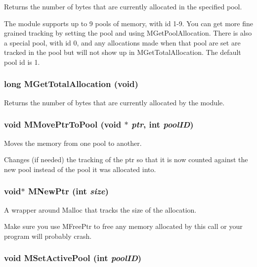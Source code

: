 Returns the number of bytes that are currently allocated in the specified pool. 

The module supports up to 9 pools of memory, with id 1-9. You can get more fine grained tracking by setting the pool and using MGet\-Pool\-Allocation. There is also a special pool, with id 0, and any allocations made when that pool are set are tracked in the pool but will not show up in MGet\-Total\-Allocation. The default pool id is 1. 
\subsubsection{\setlength{\rightskip}{0pt plus 5cm}long MGet\-Total\-Allocation (void)}\label{memory_8h_a19}


Returns the number of bytes that are currently allocated by the module. 

\subsubsection{\setlength{\rightskip}{0pt plus 5cm}void MMove\-Ptr\-To\-Pool (void $\ast$ {\em ptr}, int {\em pool\-ID})}\label{memory_8h_a23}


Moves the memory from one pool to another. 

Changes (if needed) the tracking of the ptr so that it is now counted against the new pool instead of the pool it was allocated into. 
\subsubsection{\setlength{\rightskip}{0pt plus 5cm}void$\ast$ MNew\-Ptr (int {\em size})}\label{memory_8h_a8}


A wrapper around Malloc that tracks the size of the allocation. 

Make sure you use MFree\-Ptr to free any memory allocated by this call or your program will probably crash. 
\subsubsection{\setlength{\rightskip}{0pt plus 5cm}void MSet\-Active\-Pool (int {\em pool\-ID})}\label{memory_8h_a20}


